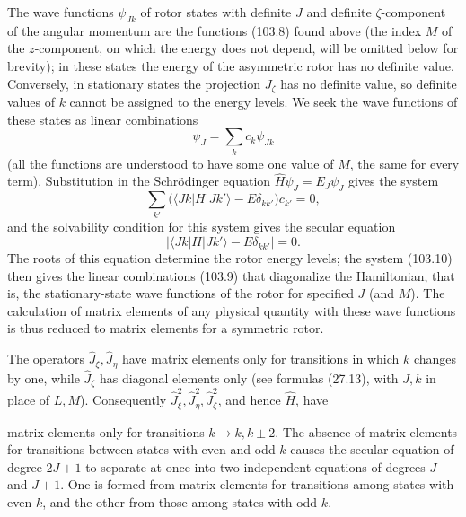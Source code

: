 The wave functions $\psi_{Jk}$ of rotor states with definite $J$ and definite $\zeta$-component of the angular momentum are the functions (103.8) found above (the index $M$ of the $z$-component, on which the energy does not depend, will be omitted below for brevity); in these states the energy of the asymmetric rotor has no definite value. Conversely, in stationary states the projection $J_\zeta$ has no definite value, so definite values of $k$ cannot be assigned to the energy levels. We seek the wave functions of these states as linear combinations
\begin{equation}
 \psi_J=\sum_k c_k\psi_{Jk} \tag{103.9}
\end{equation}
(all the functions are understood to have some one value of $M$, the same for every term). Substitution in the Schrödinger equation $\hat H\psi_J=E_J\psi_J$ gives the system
\begin{equation}
 \sum_{k'}\bigl(\langle Jk|H|Jk'\rangle-E\delta_{kk'}\bigr)c_{k'}=0, \tag{103.10}
\end{equation}
and the solvability condition for this system gives the secular equation
\begin{equation}
 \left|\langle Jk|H|Jk'\rangle-E\delta_{kk'}\right|=0. \tag{103.11}
\end{equation}
The roots of this equation determine the rotor energy levels; the system (103.10) then gives the linear combinations (103.9) that diagonalize the Hamiltonian, that is, the stationary-state wave functions of the rotor for specified $J$ (and $M$). The calculation of matrix elements of any physical quantity with these wave functions is thus reduced to matrix elements for a symmetric rotor.

The operators $\hat J_\xi,\hat J_\eta$ have matrix elements only for transitions in which $k$ changes by one, while $\hat J_\zeta$ has diagonal elements only (see formulas (27.13), with $J,k$ in place of $L,M$). Consequently $\hat J_\xi^2,\hat J_\eta^2,\hat J_\zeta^2$, and hence $\hat H$, have

matrix elements only for transitions $k\to k,k\pm2$. The absence of matrix elements for transitions between states with even and odd $k$ causes the secular equation of degree $2J+1$ to separate at once into two independent equations of degrees $J$ and $J+1$. One is formed from matrix elements for transitions among states with even $k$, and the other from those among states with odd $k$.

